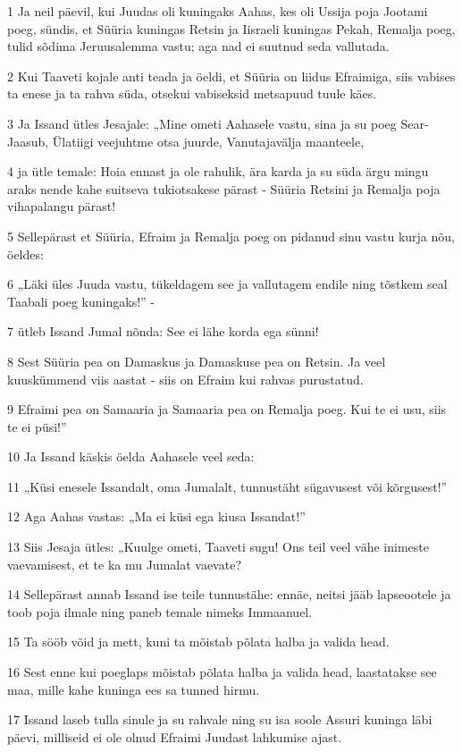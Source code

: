 \par 1 Ja neil päevil, kui Juudas oli kuningaks Aahas, kes oli Ussija poja Jootami poeg, sündis, et Süüria kuningas Retsin ja Iisraeli kuningas Pekah, Remalja poeg, tulid sõdima Jeruusalemma vastu; aga nad ei suutnud seda vallutada.
\par 2 Kui Taaveti kojale anti teada ja öeldi, et Süüria on liidus Efraimiga, siis vabises ta enese ja ta rahva süda, otsekui vabiseksid metsapuud tuule käes.
\par 3 Ja Issand ütles Jesajale: „Mine ometi Aahasele vastu, sina ja su poeg Sear-Jaasub, Ülatiigi veejuhtme otsa juurde, Vanutajavälja maanteele,
\par 4 ja ütle temale: Hoia ennast ja ole rahulik, ära karda ja su süda ärgu mingu araks nende kahe suitseva tukiotsakese pärast - Süüria Retsini ja Remalja poja vihapalangu pärast!
\par 5 Sellepärast et Süüria, Efraim ja Remalja poeg on pidanud sinu vastu kurja nõu, öeldes:
\par 6 „Läki üles Juuda vastu, tükeldagem see ja vallutagem endile ning tõstkem seal Taabali poeg kuningaks!” -
\par 7 ütleb Issand Jumal nõnda: See ei lähe korda ega sünni!
\par 8 Sest Süüria pea on Damaskus ja Damaskuse pea on Retsin. Ja veel kuuskümmend viis aastat - siis on Efraim kui rahvas purustatud.
\par 9 Efraimi pea on Samaaria ja Samaaria pea on Remalja poeg. Kui te ei usu, siis te ei püsi!”
\par 10 Ja Issand käskis öelda Aahasele veel seda:
\par 11 „Küsi enesele Issandalt, oma Jumalalt, tunnustäht sügavusest või kõrgusest!”
\par 12 Aga Aahas vastas: „Ma ei küsi ega kiusa Issandat!”
\par 13 Siis Jesaja ütles: „Kuulge ometi, Taaveti sugu! Ons teil veel vähe inimeste vaevamisest, et te ka mu Jumalat vaevate?
\par 14 Sellepärast annab Issand ise teile tunnustähe: ennäe, neitsi jääb lapseootele ja toob poja ilmale ning paneb temale nimeks Immaanuel.
\par 15 Ta sööb võid ja mett, kuni ta mõistab põlata halba ja valida head.
\par 16 Sest enne kui poeglaps mõistab põlata halba ja valida head, laastatakse see maa, mille kahe kuninga ees sa tunned hirmu.
\par 17 Issand laseb tulla sinule ja su rahvale ning su isa soole Assuri kuninga läbi päevi, milliseid ei ole olnud Efraimi Juudast lahkumise ajast.
